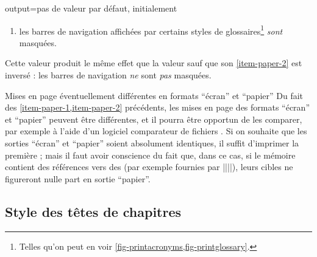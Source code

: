 \begin{docKey}{output}{=\textbar{}\textbar{}}{pas
    de valeur par défaut, initialement }
\begin{description}
\begin{enumerate}
\begin{enumerate}
      \end{enumerate}
    \item%
      \label{item-paper-2}%
      les barres de navigation affichées par certains styles de
      glossaires\footnote{Telles qu'on peut en voir
        \vref{fig-printacronyms,fig-printglossary}.} \emph{sont} masquées.
    \end{enumerate}
  \item[\docValue{paper*}.]%
    Cette valeur produit le même effet que la valeur  sauf que
    son \vref{item-paper-2} est inversé : les barres de navigation \emph{ne}
    sont \emph{pas} masquées.
  \end{description}
\end{docKey}

\begin{dbwarning}{Mises en page éventuellement différentes en formats
    \enquote{écran} et \enquote{papier}}{}
  Du fait des \cref{item-paper-1,item-paper-2} précédents, les mises en page des
  formats \enquote{écran} et \enquote{papier} peuvent être différentes, et il
  pourra être opportun de les comparer, par exemple à l'aide d'un logiciel
  comparateur de fichiers . Si on souhaite que les sorties
  \enquote{écran} et \enquote{papier} soient absolument identiques, il suffit
  d'imprimer la première ; mais il faut avoir conscience du fait que, dans ce
  cas, si le mémoire contient des références vers des  (par
  exemple fournies par
  |\href{|\meta{\normalfont\ttfamily\glsxtrshort*{url}}|}{||}|), leurs
  cibles ne figureront nulle part en sortie \enquote{papier}.
\end{dbwarning}

\subsection{Style des têtes de chapitres}\label{sec-style-des-tetes}


